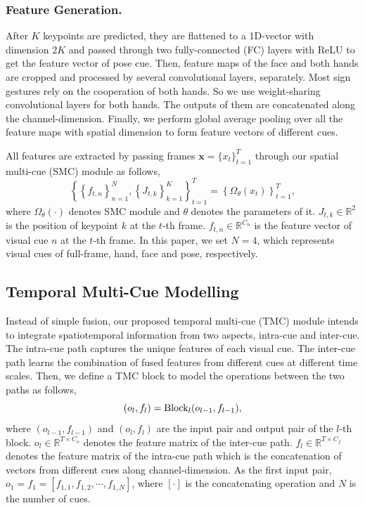 \documentclass[letterpaper]{article} %
\begin{document}
\subsubsection{Feature Generation.}
After $K$ keypoints are predicted, they are flattened to a 1D-vector with dimension $2K$ and passed through two fully-connected (FC) layers with ReLU to get the feature vector of pose cue. Then, feature maps of the face and both hands are cropped and processed by several convolutional layers, separately. Most sign gestures rely on the cooperation of both hands. So we use weight-sharing convolutional layers for both hands. The outputs of them are concatenated along the channel-dimension. Finally, we perform global average pooling over all the feature maps with spatial dimension to form feature vectors of different cues.

All features are extracted by passing frames $\mathbf{x}=\{x_t\}_{t=1}^T$ through our spatial multi-cue (SMC) module as follows,
\begin{equation} \label{eq:smc}
    \left\{ \left\{f_{t,n}\right\}_{n=1}^N , \left\{J_{t,k}\right\}_{k=1}^K \right\}_{t=1}^T = \left\{ \Omega_\theta(x_t) \right\}_{t=1}^T,
\end{equation}
where \(\Omega_\theta(\cdot)\) denotes SMC module and $\theta$ denotes the parameters of it. $J_{t,k}\in\mathbb{R}^2$ is the position of keypoint $k$ at the $t$-th frame. $f_{t,n}\in\mathbb{R}^{C_n}$ is the feature vector of visual cue $n$ at the $t$-th frame. In this paper, we set $N=4$, which represents visual cues of full-frame, hand, face and pose, respectively. 


\subsection{Temporal Multi-Cue Modelling}
Instead of simple fusion, our proposed temporal multi-cue (TMC) module intends to integrate spatiotemporal information from two aspects, intra-cue and inter-cue. The intra-cue path captures the unique features of each visual cue. The inter-cue path learns the combination of fused features from different cues at different time scales. Then, we define a TMC block to model the operations between the two paths as follows,
\begin{equation}
    ({o_l,f_l}) = {\rm Block}_l({o_{l-1}, f_{l-1}}),
\end{equation}
where $(o_{l-1},f_{l-1})$ and $(o_l,f_l)$ are the input pair and output pair of the $l$-th block. 
$o_l\in\mathbb{R}^{T\times C_o}$ denotes the feature matrix of the inter-cue path. 
$f_l\in\mathbb{R}^{T\times C_f}$ denotes the feature matrix of the intra-cue path which is the concatenation of vectors from different cues along channel-dimension. 
As the first input pair, $o_1\!=\!f_1\!=\![f_{1,1}, f_{1,2}, \cdots, f_{1,N}]$, where $[\cdot]$ is the concatenating operation and $N$ is the number of cues. 
\end{document}

